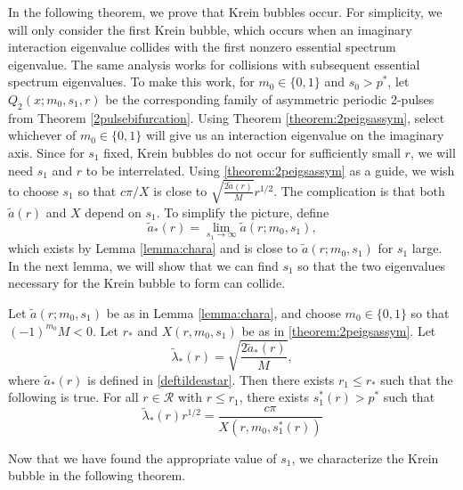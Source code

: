 \documentclass[thesis.tex]{subfiles}
\begin{document}
In the following theorem, we prove that Krein bubbles occur. For simplicity, we will only consider the first Krein bubble, which occurs when an imaginary interaction eigenvalue collides with the first nonzero essential spectrum eigenvalue. The same analysis works for collisions with subsequent essential spectrum eigenvalues. To make this work, for $m_0 \in \{ 0, 1 \}$ and $s_0 > p^*$, let $Q_2(x; m_0, s_1, r)$ be the corresponding family of asymmetric periodic 2-pulses from Theorem \ref{2pulsebifurcation}. Using Theorem \ref{theorem:2peigsassym}, select whichever of $m_0 \in \{ 0, 1 \}$ will give us an interaction eigenvalue on the imaginary axis. Since for $s_1$ fixed, Krein bubbles do not occur for sufficiently small $r$, we will need $s_1$ and $r$ to be interrelated. Using \cref{theorem:2peigsassym} as a guide, we wish to choose $s_1$ so that $c \pi/X$ is close to $\sqrt{\frac{2 \tilde{a}(r)}{M}}r^{1/2}$. The complication is that both $\tilde{a}(r)$ and $X$ depend on $s_1$. To simplify the picture, define
\begin{equation}\label{deftildeastar}
\tilde{a}_*(r) = \lim_{s_1 \rightarrow \infty} \tilde{a}(r; m_0, s_1),
\end{equation}
which exists by Lemma \ref{lemma:chara} and is close to $\tilde{a}(r; m_0, s_1)$ for $s_1$ large. In the next lemma, we will show that we can find $s_1$ so that the two eigenvalues necessary for the Krein bubble to form can collide.

\begin{lemma}\label{lemma:s1choice}
Let $\tilde{a}(r; m_0, s_1)$ be as in Lemma \ref{lemma:chara}, and choose $m_0 \in \{ 0, 1\}$ so that $(-1)^{m_0}M < 0$. Let $r_*$ and $X(r, m_0, s_1)$ be as in \cref{theorem:2peigsassym}. Let
\begin{equation}\label{tildelambdastar}
\tilde{\lambda}_*(r) = \sqrt{\frac{ 2 \tilde{a}_*(r) }{M}},
\end{equation}
where $\tilde{a}_*(r)$ is defined in \cref{deftildeastar}. Then there exists $r_1 \leq r_*$ such that the following is true. For all $r \in \mathcal{R}$ with $r \leq r_1$, there exists $s_1^*(r) > p^*$ such that
\begin{equation}\label{choosesstar}
\tilde{\lambda}_*(r) r^{1/2} = \frac{c \pi}{X(r, m_0, s_1^*(r))}
\end{equation}
\end{lemma}

Now that we have found the appropriate value of $s_1$, we characterize the Krein bubble in the following theorem.
\end{document}
